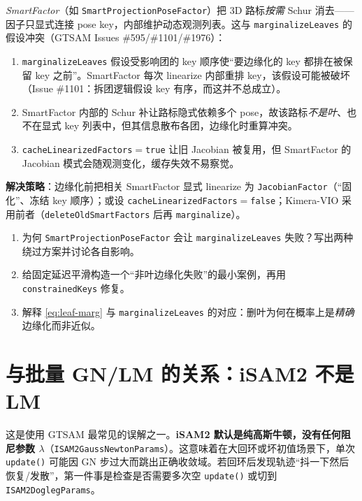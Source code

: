 \emph{SmartFactor}（如 \texttt{SmartProjectionPoseFactor}）把 3D 路标\emph{按需} Schur 消去——因子只显式连接 pose key，内部维护动态观测列表。这与 \texttt{marginalizeLeaves} 的假设冲突（GTSAM Issues \#595/\#1101/\#1976）：
\begin{enumerate}
  \item \texttt{marginalizeLeaves} 假设受影响团的 key 顺序使“要边缘化的 key 都排在被保留 key 之前”。SmartFactor 每次 linearize 内部重排 key，该假设可能被破坏（Issue \#1101：拆团逻辑假设 key 有序，而这并不总成立）。
  \item SmartFactor 内部的 Schur 补让路标隐式依赖多个 pose，故该路标\emph{不是叶}、也不在显式 key 列表中，但其信息散布各团，边缘化时重算冲突。
  \item \texttt{cacheLinearizedFactors}$=$\texttt{true} 让旧 Jacobian 被复用，但 SmartFactor 的 Jacobian 模式会随观测变化，缓存失效不易察觉。
\end{enumerate}
\textbf{解决策略}：边缘化前把相关 SmartFactor 显式 linearize 为 \texttt{JacobianFactor}（“固化”、冻结 key 顺序）；或设 \texttt{cacheLinearizedFactors}$=$\texttt{false}；Kimera-VIO 采用前者（\texttt{deleteOldSmartFactors} 后再 \texttt{marginalize}）。

\begin{practice}
\begin{enumerate}
  \item 为何 \texttt{SmartProjectionPoseFactor} 会让 \texttt{marginalizeLeaves} 失败？写出两种绕过方案并讨论各自影响。
  \item 给固定延迟平滑构造一个“非叶边缘化失败”的最小案例，再用 \texttt{constrainedKeys} 修复。
  \item 解释 \cref{eq:leaf-marg} 与 \texttt{marginalizeLeaves} 的对应：删叶为何在概率上是\emph{精确}边缘化而非近似。
\end{enumerate}
\end{practice}

\section{与批量 GN/LM 的关系：iSAM2 不是 LM}
\label{sec:isam-gn}

\begin{pitfall}
这是使用 GTSAM 最常见的误解之一。\textbf{iSAM2 默认是纯高斯牛顿，没有任何阻尼参数 $\lambda$}（\texttt{ISAM2GaussNewtonParams}）。这意味着在大回环或坏初值场景下，单次 \texttt{update()} 可能因 GN 步过大而跳出正确收敛域。若回环后发现轨迹“抖一下然后恢复/发散”，第一件事是检查是否需要多次空 \texttt{update()} 或切到 \texttt{ISAM2DoglegParams}。
\end{pitfall}

